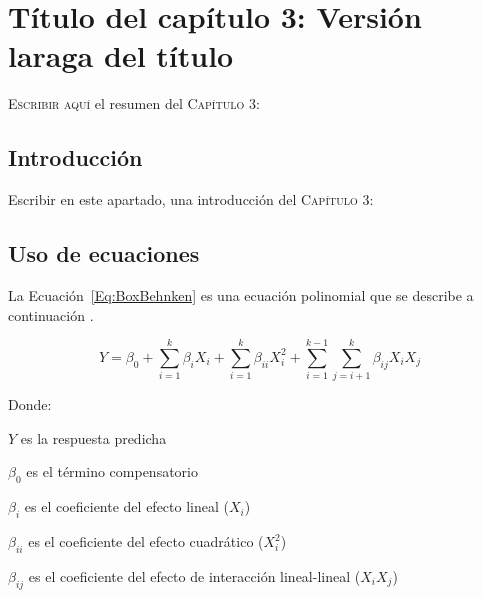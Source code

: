 \chapter{Título del capítulo 3: Versión laraga del título}


\begin{ResumenPhDThesis}
\begin{changemargin}{1cm}{1cm}
\lettrine[lines=3]{E}{scribir aquí} el resumen del \textsc{Capítulo 3}: \lipsum[3]
\end{changemargin}
\end{ResumenPhDThesis}


\section{Introducción}
Escribir en este apartado, una introducción del \textsc{Capítulo 3}: \lipsum[1]


\section{Uso de ecuaciones}
La Ecuación~\ref{Eq:BoxBehnken} es una ecuación polinomial que se describe a continuación \citep{du2014beta}.

\begin{equation}\label{Eq:BoxBehnken}
Y = \beta_{0} + \sum_{i=1}^{k} \beta_{i} X_{i} + \sum_{i=1}^{k} \beta_{ii} X_{i}^{2} + \sum_{i=1}^{k-1} \sum_{j=i+1}^{k} \beta_{ij} X_{i} X_{j}
\end{equation}


Donde:
\begin{description}
	\item $Y$ es la respuesta predicha
	\item $\beta_{0}$ es el término compensatorio
	\item $\beta_{i}$ es el coeficiente del efecto lineal ($X_{i}$)
	\item $\beta_{ii}$ es el coeficiente del efecto cuadrático ($X_{i}^{2}$)
	\item $\beta_{ij}$ es el coeficiente del efecto de interacción lineal-lineal ($X_{i} X_{j}$)
\end{description}

